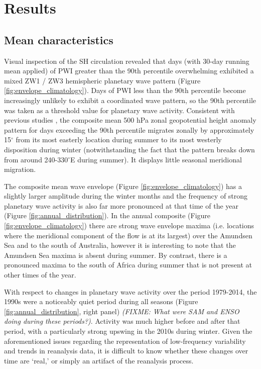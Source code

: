 \section{Results}

\subsection{Mean characteristics}

Visual inspection of the SH circulation revealed that days (with 30-day running mean applied) of PWI greater than the 90th percentile overwhelming exhibited a mixed ZW1 / ZW3 hemispheric planetary wave pattern (Figure \ref{fig:envelope_climatology}). Days of PWI less than the 90th percentile become increasingly unlikely to exhibit a coordinated wave pattern, so the 90th percentile was taken as a threshold value for planetary wave activity. Consistent with previous studies \citep{vanLoon1984,Mo1985}, the composite mean 500 hPa zonal geopotential height anomaly pattern for days exceeding the 90th percentile migrates zonally by approximately 15$^{\circ}$ from its most easterly location during summer to its most westerly disposition during winter (notwithstanding the fact that the pattern breaks down from around 240-330$^{\circ}$E during summer). It displays little seasonal meridional migration.

The composite mean wave envelope (Figure \ref{fig:envelope_climatology}) has a slightly larger amplitude during the winter months and the frequency of strong planetary wave activity is also far more pronounced at that time of the year (Figure \ref{fig:annual_distribution}). In the annual composite (Figure \ref{fig:envelope_climatology}) there are strong wave envelope maxima (i.e. locations where the meridional component of the flow is at its largest) over the Amundsen Sea and to the south of Australia, however it is interesting to note that the Amundsen Sea maxima is absent during summer. By contrast, there is a pronounced maxima to the south of Africa during summer that is not present at other times of the year.

With respect to changes in planetary wave activity over the period 1979-2014, the 1990s were a noticeably quiet period during all seasons (Figure \ref{fig:annual_distribution}, right panel) \textit{(FIXME: What were SAM and ENSO doing during these periods?)}. Activity was much higher before and after that period, with a particularly strong upswing in the 2010s during winter. Given the aforementioned issues regarding the representation of low-frequency variability and trends in reanalysis data, it is difficult to know whether these changes over time are `real,' or simply an artifact of the reanalysis process.
